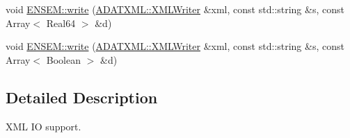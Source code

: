 \begin{DoxyCompactItemize}
\item 
void \mbox{\hyperlink{namespaceENSEM_a3723b1ab200b48b7d24a4beee45aceef}{E\+N\+S\+E\+M\+::write}} (\mbox{\hyperlink{classADATXML_1_1XMLWriter}{A\+D\+A\+T\+X\+M\+L\+::\+X\+M\+L\+Writer}} \&xml, const std\+::string \&s, const Array$<$ Real64 $>$ \&d)
\item 
void \mbox{\hyperlink{namespaceENSEM_ac8d30a87c5709126729f9c0169804c2a}{E\+N\+S\+E\+M\+::write}} (\mbox{\hyperlink{classADATXML_1_1XMLWriter}{A\+D\+A\+T\+X\+M\+L\+::\+X\+M\+L\+Writer}} \&xml, const std\+::string \&s, const Array$<$ Boolean $>$ \&d)
\end{DoxyCompactItemize}


\subsection{Detailed Description}
X\+ML IO support. 

